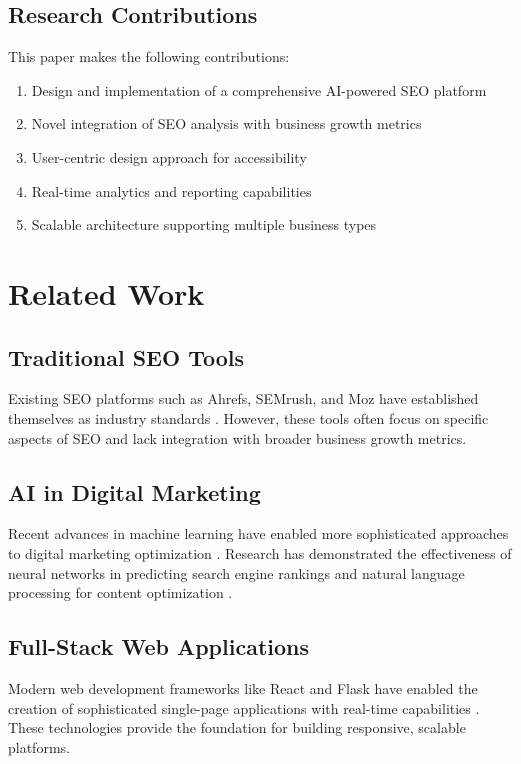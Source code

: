 \documentclass[11pt,a4paper]{article}
\begin{document}
\subsection{Research Contributions}
This paper makes the following contributions:
\begin{enumerate}
    \item Design and implementation of a comprehensive AI-powered SEO platform
    \item Novel integration of SEO analysis with business growth metrics
    \item User-centric design approach for accessibility
    \item Real-time analytics and reporting capabilities
    \item Scalable architecture supporting multiple business types
\end{enumerate}

\section{Related Work}
\label{sec:related_work}

\subsection{Traditional SEO Tools}
Existing SEO platforms such as Ahrefs, SEMrush, and Moz have established themselves as industry standards \cite{seo_tools}. However, these tools often focus on specific aspects of SEO and lack integration with broader business growth metrics.

\subsection{AI in Digital Marketing}
Recent advances in machine learning have enabled more sophisticated approaches to digital marketing optimization \cite{ai_marketing}. Research has demonstrated the effectiveness of neural networks in predicting search engine rankings \cite{neural_seo} and natural language processing for content optimization \cite{nlp_seo}.

\subsection{Full-Stack Web Applications}
Modern web development frameworks like React and Flask have enabled the creation of sophisticated single-page applications with real-time capabilities \cite{web_frameworks}. These technologies provide the foundation for building responsive, scalable platforms.
\end{document}
